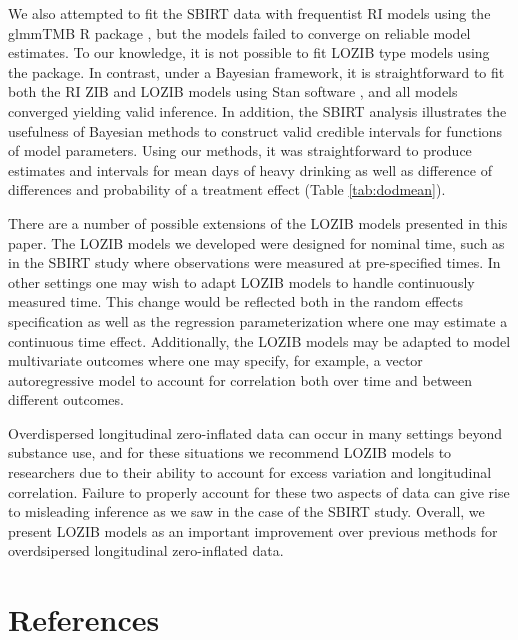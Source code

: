 \documentclass[12pt]{article}
\begin{document}
We also attempted to fit the SBIRT data with frequentist RI models using the glmmTMB R package \citep{brooks2017glmmtmb}, but the models failed to converge on reliable model estimates. To our knowledge, it is not possible to fit LOZIB type models using the package. In contrast, under a Bayesian framework, it is straightforward to fit both the RI ZIB and LOZIB models using Stan software \citep{gelman2015stan}, and all models converged yielding valid inference. In addition, the SBIRT analysis illustrates the usefulness of Bayesian methods to construct valid credible intervals for functions of model parameters. Using our methods, it was straightforward to produce estimates and intervals for mean days of heavy drinking as well as difference of differences and probability of a treatment effect (Table \ref{tab:dodmean}).

There are a number of possible extensions of the LOZIB models presented in this paper. The LOZIB models we developed were designed for nominal time, such as in the SBIRT study where observations were measured at pre-specified times. In other settings one may wish to adapt LOZIB models to handle continuously measured time. This change would be reflected both in the random effects specification as well as the regression parameterization where one may estimate a continuous time effect. Additionally, the LOZIB models may be adapted to model multivariate outcomes where one may specify, for example, a vector autoregressive model to account for correlation both over time and between different outcomes.

Overdispersed longitudinal zero-inflated data can occur in many settings beyond substance use, and for these situations we recommend LOZIB models to researchers due to their ability to account for excess variation and longitudinal correlation. Failure to properly account for these two aspects of data can give rise to misleading inference as we saw in the case of the SBIRT study. Overall, we present LOZIB models as an important improvement over previous methods for overdsipersed longitudinal zero-inflated data.


\newpage

\section{References}


\end{document}
